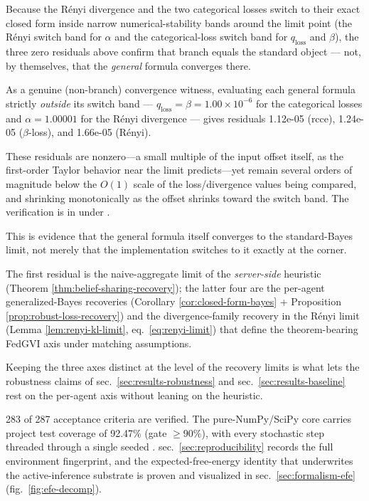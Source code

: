 \documentclass[
  english,
]{article}
\theoremstyle{plain}
\theoremstyle{definition}
\theoremstyle{remark}
\theoremstyle{definition}
\begin{document}
Because the Rényi divergence and the two categorical losses switch to
their exact closed form inside narrow numerical-stability bands around
the limit point (the Rényi switch band for \(\alpha\) and the
categorical-loss switch band for \(q_{\text{loss}}\) and \(\beta\)), the
three zero residuals above confirm that branch equals the standard
object --- not, by themselves, that the \emph{general} formula converges
there.

As a genuine (non-branch) convergence witness, evaluating each general
formula strictly \emph{outside} its switch band ---
\(q_{\text{loss}} = \beta =
1.00 \times 10^{-6}\) for the categorical losses and
\(\alpha = 1.00001\) for the Rényi divergence --- gives residuals
1.12e-05 (rcce), 1.24e-05 (\(\beta\)-loss), and 1.66e-05 (Rényi).

These residuals are nonzero---a small multiple of the input offset
itself, as the first-order Taylor behavior near the limit predicts---yet
remain several orders of magnitude below the \(O(1)\) scale of the
loss/divergence values being compared, and shrinking monotonically as
the offset shrinks toward the switch band. The verification is in
 under .

This is evidence that the general formula itself converges to the
standard-Bayes limit, not merely that the implementation switches to it
exactly at the corner.

The first residual is the naive-aggregate limit of the
\emph{server-side} heuristic (Theorem
\ref{thm:belief-sharing-recovery}); the latter four are the per-agent
generalized-Bayes recoveries (Corollary \ref{cor:closed-form-bayes} +
Proposition \ref{prop:robust-loss-recovery}) and the divergence-family
recovery in the Rényi limit (Lemma \ref{lem:renyi-kl-limit},
eq.~\ref{eq:renyi-limit}) that define the theorem-bearing FedGVI axis
under matching assumptions.

Keeping the three axes distinct at the level of the recovery limits is
what lets the robustness claims of sec.~\ref{sec:results-robustness} and
sec.~\ref{sec:results-baseline} rest on the per-agent axis without
leaning on the heuristic.

283 of 287 acceptance criteria are verified. The pure-NumPy/SciPy core
carries project test coverage of 92.47\% (gate \(\ge 90\%\)), with every
stochastic step threaded through a single seeded
. sec.~\ref{sec:reproducibility}
records the full environment fingerprint, and the expected-free-energy
identity that underwrites the active-inference substrate is proven and
visualized in sec.~\ref{sec:formalism-efe} (fig.~\ref{fig:efe-decomp}).
\end{document}
